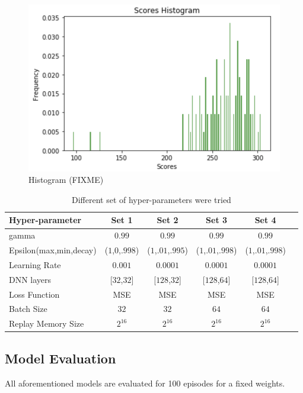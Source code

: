 \begin{figure}[!ht]
\centering
\includegraphics[scale=0.75,width=0.75\columnwidth]{figures/Histogram.png}%
\caption{ Histogram (FIXME)}%
\label{fig:Visualization}%
\end{figure}

\label{sec:exp1}
\begin{table}%
\centering
\begin{tabular}{|l|c|c|c|c|c|}
\hline
Hyper-parameter & Set 1  & Set 2 & Set 3 & Set 4  \\
\hline
gamma & $0.99$ & $0.99$ & $0.99$ & $0.99$ \\
\hline
Epsilon(max,min,decay) & ($1$,$0$,$.998$) &  ($1$,$.01$,$.995$) &  ($1$,$.01$,$.998$) &  ($1$,$.01$,$.998$) \\
\hline
Learning Rate & $0.001$ & $0.0001$ & $0.0001$ & $0.0001$ \\
\hline
DNN layers & [$32$,$32$] &  [$128$,$32$] &  [$128$,$64$] &  [$128$,$64$] \\
\hline
Loss Function & MSE & MSE & MSE & MSE \\
\hline
Batch Size & $32$ & $32$  & $64$  & $64$  \\
\hline
Replay Memory Size & $2^16$ & $2^16$  & $2^16$  & $2^16$  \\
\hline
\end{tabular}
\caption{Different set of hyper-parameters were tried}
\label{tab:accuracy1}
\end{table}



\subsection{ Model Evaluation}

All aforementioned models are evaluated for 100 episodes for a fixed weights. 

